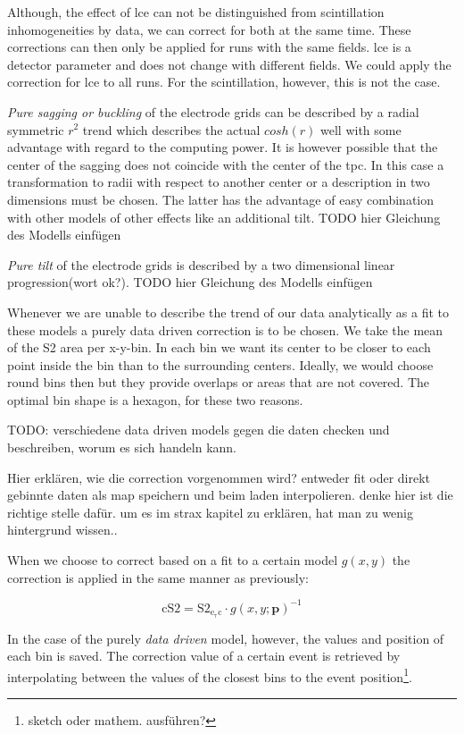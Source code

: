 Although, the effect of \gls{lce} can not be distinguished from scintillation inhomogeneities by data, we can correct for both at the same time.
These corrections can then only be applied for runs with the same fields.
\gls{lce} is a detector parameter and does not change with different fields.
We could apply the correction for \gls{lce} to all runs.
For the scintillation, however, this is not the case.




\emph{Pure sagging or buckling} of the electrode grids can be described by a radial symmetric $ r^2 $ trend which describes the actual $ cosh\left( r \right) $ well with some advantage with regard to the computing power.
It is however possible that the center of the sagging does not coincide with the center of the \gls{tpc}.
In this case a transformation to radii with respect to another center or a description in two dimensions must be chosen.
The latter has the advantage of easy combination with other models of other effects like an additional tilt.
TODO hier Gleichung des Modells einfügen

\emph{Pure tilt} of the electrode grids is described by a two dimensional linear progression(wort ok?).
TODO hier Gleichung des Modells einfügen

Whenever we are unable to describe the trend of our data analytically as a fit to these models a purely data driven correction is to be chosen.
We take the mean of the S2 area per x-y-bin.
In each bin we want its center to be closer to each point inside the bin than to the surrounding centers.
Ideally, we would choose round bins then but they provide overlaps or areas that are not covered.
The optimal bin shape is a hexagon, for these two reasons.

TODO: verschiedene data driven models gegen die daten checken und beschreiben, worum es sich handeln kann.


Hier erklären, wie die correction vorgenommen wird? entweder fit oder direkt gebinnte daten als map speichern und beim laden interpolieren. denke hier ist die richtige stelle dafür. um es im strax kapitel zu erklären, hat man zu wenig hintergrund wissen..

When we choose to correct based on a fit to a certain model $ g\left( x,y \right) $ the correction is applied in the same manner as previously:

\begin{equation} %
    \mathrm{cS2} = \mathrm{S2_\mathrm{e_\tau c}} \cdot g\left( x,y; \mathbf{p} \right)^{-1}
    \label{eq:cs2}
\end{equation}

In the case of the purely \emph{data driven} model, however, the values and position of each bin is saved.
The correction value of a certain event is retrieved by interpolating between the values of the closest bins to the event position\footnote{sketch oder mathem. ausführen?}.


